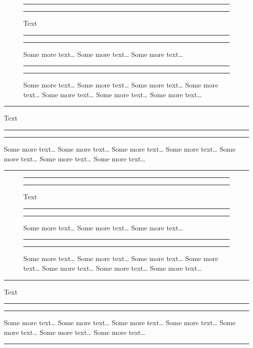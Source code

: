 \documentclass{amsart}
\begin{document}
\begin{figure}
\hrule
\caption{Text}
\hrule
\end{figure}
\begin{figure}
\hrule
\caption{Some more text\ldots{} Some more text\ldots{} Some more text\ldots{}}
\hrule
\end{figure}
\begin{figure}
\hrule
\caption{Some more text\ldots{} Some more text\ldots{} Some more text\ldots{} Some more text\ldots{} Some more text\ldots{} Some more text\ldots{} Some more text\ldots{}}
\hrule
\end{figure}
\begin{table}
\hrule
\caption{Text}
\hrule
\end{table}
\begin{table}
\hrule
\caption{Some more text\ldots{} Some more text\ldots{} Some more text\ldots{} Some more text\ldots{} Some more text\ldots{} Some more text\ldots{} Some more text\ldots{}}
\hrule
\end{table}

\clearpage
\captionsetup{margin=default}

\begin{figure}
\hrule
\caption{Text}
\hrule
\end{figure}
\begin{figure}
\hrule
\caption{Some more text\ldots{} Some more text\ldots{} Some more text\ldots{}}
\hrule
\end{figure}
\begin{figure}
\hrule
\caption{Some more text\ldots{} Some more text\ldots{} Some more text\ldots{} Some more text\ldots{} Some more text\ldots{} Some more text\ldots{} Some more text\ldots{}}
\hrule
\end{figure}
\begin{table}
\hrule
\caption{Text}
\hrule
\end{table}
\begin{table}
\hrule
\caption{Some more text\ldots{} Some more text\ldots{} Some more text\ldots{} Some more text\ldots{} Some more text\ldots{} Some more text\ldots{} Some more text\ldots{}}
\hrule
\end{table}
\end{document}
